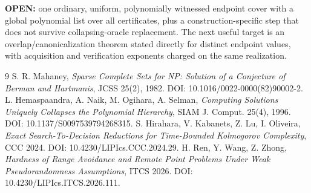 \documentclass[11pt]{article}
\begin{document}
\textbf{OPEN:} one ordinary, uniform, polynomially witnessed endpoint
cover with a global polynomial list over all certificates, plus a
construction-specific step that does not survive collapsing-oracle
replacement.  The next useful target is an overlap/canonicalization
theorem stated directly for distinct endpoint values, with acquisition
and verification exponents charged on the same realization.

\begin{thebibliography}{9}
 S. R. Mahaney, \emph{Sparse Complete Sets for NP:
Solution of a Conjecture of Berman and Hartmanis}, JCSS 25(2), 1982.
DOI: 10.1016/0022-0000(82)90002-2.
 L. Hemaspaandra, A. Naik, M. Ogihara, A. Selman,
\emph{Computing Solutions Uniquely Collapses the Polynomial Hierarchy},
SIAM J. Comput. 25(4), 1996. DOI: 10.1137/S0097539794268315.
 S. Hirahara, V. Kabanets, Z. Lu, I. Oliveira,
\emph{Exact Search-To-Decision Reductions for Time-Bounded Kolmogorov
Complexity}, CCC 2024. DOI: 10.4230/LIPIcs.CCC.2024.29.
 H. Ren, Y. Wang, Z. Zhong, \emph{Hardness of Range
Avoidance and Remote Point Problems Under Weak Pseudorandomness
Assumptions}, ITCS 2026. DOI: 10.4230/LIPIcs.ITCS.2026.111.
\end{thebibliography}
\end{document}
